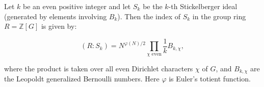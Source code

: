 Let $k$ be an even positive integer and let $S_k$ be the $k$-th Stickelberger ideal
(generated by elements involving $B_k$). Then the index of $S_k$ in the group ring
$R = \mathbb{Z}[G]$ is given by:

$$(R : S_k) = N^{\varphi(N)/2} \prod_{\chi \text{ even}} \frac{1}{k} B_{k,\chi},$$

where the product is taken over all even Dirichlet characters $\chi$ of $G$, and
$B_{k,\chi}$ are the Leopoldt generalized Bernoulli numbers. Here $\varphi$ is
Euler's totient function.
